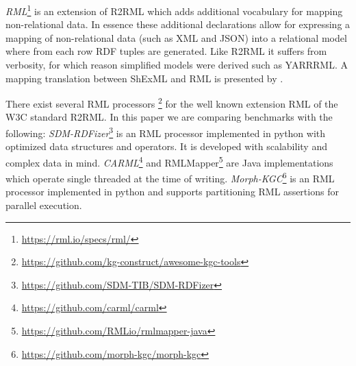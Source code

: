 \emph{RML}\footnote{\url{https://rml.io/specs/rml/}} is an extension of R2RML which adds additional vocabulary for mapping non-relational data\citep{Dimou2014, Dimou2020}. In essence these additional declarations allow for expressing a mapping of non-relational data (such as XML and JSON) into a relational model where from each row RDF tuples are generated. Like R2RML it suffers from verbosity, for which reason simplified models were derived such as YARRRML\cite{heyvaert2018declarativeyarrrml}.
A mapping translation between ShExML\cite{GarciaGonzalez2021} and RML is presented by \cite{GarciaGonzalez2022}.

There exist several RML processors \cite{ArenasGuerrero2021, Iglesias2023}\footnote{\url{https://github.com/kg-construct/awesome-kgc-tools}} for the well known extension RML of the W3C standard R2RML.
In this paper we are comparing benchmarks with the following: %
\emph{SDM-RDFizer}\footnote{\url{https://github.com/SDM-TIB/SDM-RDFizer}} is an RML processor implemented in python with optimized data structures and operators. It is developed with scalability and complex data in mind\cite{Iglesias2020}.
\emph{CARML}\footnote{\url{https://github.com/carml/carml}} and RMLMapper\footnote{\url{https://github.com/RMLio/rmlmapper-java}} are Java implementations which operate single threaded at the time of writing.
\emph{Morph-KGC}\footnote{\url{https://github.com/morph-kgc/morph-kgc}} is an RML processor implemented in python and supports partitioning RML assertions\cite{arenas2022morphkgc} for parallel execution.




